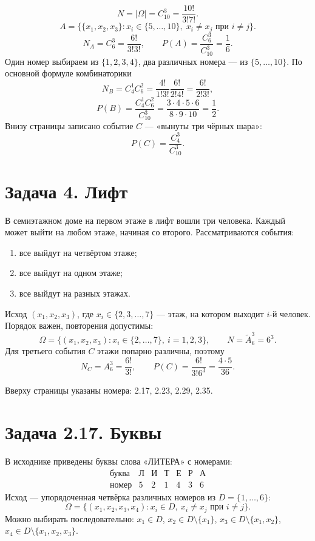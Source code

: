 \[
 N=|\Omega|=C_{10}^3=\frac{10!}{3!7!}.
\]
\[
 A=\bigl\{\{x_1,x_2,x_3\}:x_i\in\{5,\ldots,10\},\;
 x_i\ne x_j\text{ при }i\ne j\bigr\}.
\]
\[
 N_A=C_6^3=\frac{6!}{3!3!},\qquad
 P(A)=\frac{C_6^3}{C_{10}^3}=\frac16.
\]
Один номер выбираем из $\{1,2,3,4\}$, два различных номера ---
из $\{5,\ldots,10\}$. По основной формуле комбинаторики
\[
 N_B=C_4^1C_6^2=\frac{4!}{1!3!}\frac{6!}{2!4!}
 =\frac{6!}{2!3!},
\]
\[
 P(B)=\frac{C_4^1C_6^2}{C_{10}^3}
 =\frac{3\cdot4\cdot5\cdot6}{8\cdot9\cdot10}=\frac12.
\]
Внизу страницы записано событие $C$ --- «вынуты три чёрных шара»:
\[
 P(C)=\frac{C_4^3}{C_{10}^3}.
\]

\section*{Задача 4. Лифт}
В семиэтажном доме на первом этаже в лифт вошли три человека.
Каждый может выйти на любом этаже, начиная со второго. Рассматриваются события:
\begin{enumerate}
 \item все выйдут на четвёртом этаже;
 \item все выйдут на одном этаже;
 \item все выйдут на разных этажах.
\end{enumerate}
Исход $(x_1,x_2,x_3)$, где $x_i\in\{2,3,\ldots,7\}$ --- этаж,
на котором выходит $i$-й человек. Порядок важен, повторения допустимы:
\[
 \Omega=\{(x_1,x_2,x_3):x_i\in\{2,\ldots,7\},\ i=1,2,3\},
 \qquad N=\widetilde A_6^3=6^3.
\]
Для третьего события $C$ этажи попарно различны, поэтому
\[
 N_C=A_6^3=\frac{6!}{3!},\qquad
 P(C)=\frac{6!}{3!6^3}=\frac{4\cdot5}{36}.
\]

Вверху страницы указаны номера: 2.17, 2.23, 2.29, 2.35.

\section*{Задача 2.17. Буквы}
В исходнике приведены буквы слова «ЛИТЕРА» с номерами:
\[
 \begin{array}{c|cccccc}
 \text{буква}&\text{Л}&\text{И}&\text{Т}&\text{Е}&\text{Р}&\text{А}\\
 \hline
 \text{номер}&5&2&1&4&3&6
 \end{array}
\]
Исход --- упорядоченная четвёрка различных номеров из $D=\{1,\ldots,6\}$:
\[
 \Omega=\{(x_1,x_2,x_3,x_4):x_i\in D,\ x_i\ne x_j\text{ при }i\ne j\}.
\]
Можно выбирать последовательно:
$x_1\in D$, $x_2\in D\setminus\{x_1\}$,
$x_3\in D\setminus\{x_1,x_2\}$,
$x_4\in D\setminus\{x_1,x_2,x_3\}$.

